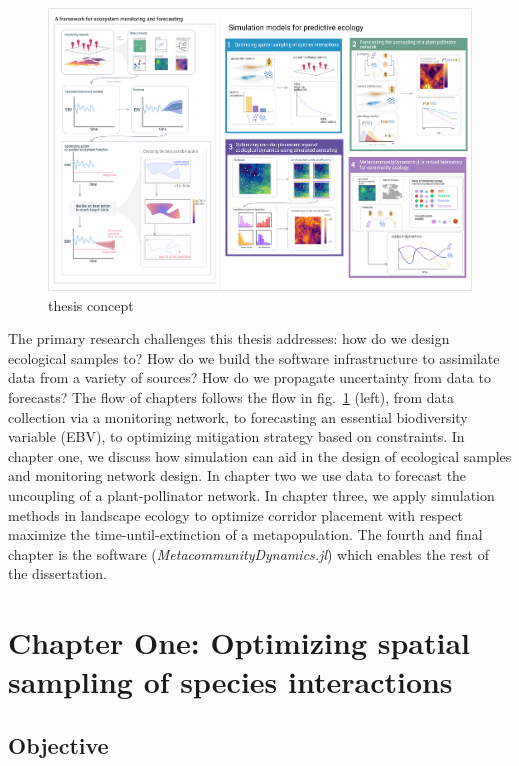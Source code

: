 \documentclass[10pt,oneside]{article}
\makeatletter
\def\maxwidth{\ifdim\Gin@nat@width>\linewidth\linewidth
\else\Gin@nat@width\fi}
\let\Oldincludegraphics\includegraphics
\renewcommand{\includegraphics}[1]{\Oldincludegraphics[width=\maxwidth]{#1}}
\makeatother
\begin{document}
\begin{figure}
\hypertarget{fig:thesis}{%
\centering
\includegraphics{./figures/thesisconcept.png}
\caption{thesis concept}\label{fig:thesis}
}
\end{figure}

The primary research challenges this thesis addresses: how do we design
ecological samples to? How do we build the software infrastructure to
assimilate data from a variety of sources? How do we propagate
uncertainty from data to forecasts? The flow of chapters follows the
flow in fig.~\ref{fig:thesis} (left), from data collection via a
monitoring network, to forecasting an essential biodiversity variable
(EBV), to optimizing mitigation strategy based on constraints. In
chapter one, we discuss how simulation can aid in the design of
ecological samples and monitoring network design. In chapter two we use
data to forecast the uncoupling of a plant-pollinator network. In
chapter three, we apply simulation methods in landscape ecology to
optimize corridor placement with respect maximize the
time-until-extinction of a metapopulation. The fourth and final chapter
is the software (\emph{MetacommunityDynamics.jl}) which enables the rest
of the dissertation.

\hypertarget{chapter-one-optimizing-spatial-sampling-of-species-interactions}{%
\section{Chapter One: Optimizing spatial sampling of species
interactions}\label{chapter-one-optimizing-spatial-sampling-of-species-interactions}}

\hypertarget{objective}{%
\subsection{Objective}\label{objective}}
\end{document}

